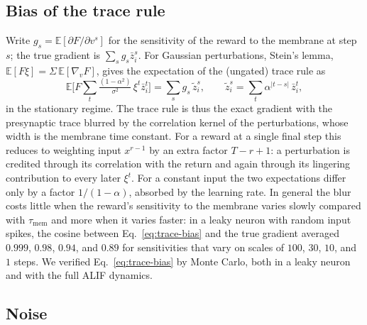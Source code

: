 \documentclass[10pt,twocolumn]{article}
\begin{document}
\subsection{Bias of the trace rule}
\label{app:trace-bias}

Write $g_s=\mathbb E[\partial F/\partial v^s]$ for the sensitivity of the
reward to the membrane at step $s$; the true gradient is
$\sum_s g_s\bar z^s_i$. For Gaussian perturbations, Stein's lemma,
$\mathbb E[F\xi]=\Sigma\,\mathbb E[\nabla_vF]$, gives the expectation of the
(ungated) trace rule as
\begin{equation}
\mathbb E\Big[F\sum_t\tfrac{(1-\alpha^2)}{\sigma^2}\,\xi^t\bar z^t_i\Big]
=\sum_s g_s\,\tilde z^s_i,\qquad
\tilde z^s_i=\sum_t\alpha^{|t-s|}\,\bar z^t_i ,
\label{eq:trace-bias}
\end{equation}
in the stationary regime. The trace rule is thus the exact gradient with the
presynaptic trace blurred by the correlation kernel of the perturbations,
whose width is the membrane time constant. For a reward at a single final step
this reduces to weighting input $x^{r-1}$ by an extra factor $T-r+1$: a
perturbation is credited through its correlation with the return and again
through its lingering contribution to every later $\xi^t$. For a constant input
the two expectations differ only by a factor $1/(1-\alpha)$, absorbed by the
learning rate. In general the blur costs little when the reward's sensitivity
to the membrane varies slowly compared with $\tau_{\mathrm{mem}}$ and more when
it varies faster: in a leaky neuron with random input spikes, the cosine between
Eq.~\eqref{eq:trace-bias} and the true gradient averaged $0.999$, $0.98$,
$0.94$, and $0.89$ for sensitivities that vary on scales of $100$, $30$, $10$,
and $1$ steps. We verified Eq.~\eqref{eq:trace-bias} by Monte Carlo, both in a
leaky neuron and with the full ALIF dynamics.

\subsection{Noise}
\label{app:trace-noise}
\end{document}
